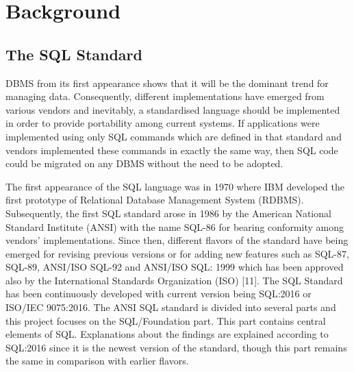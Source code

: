 \chapter{Background}

\section{The SQL Standard }
DBMS from its first appearance shows that it will be the dominant trend for managing data. Consequently, different implementations have emerged from various vendors and inevitably, a standardised language should be implemented in order to provide portability among current systems. If applications were implemented using only SQL commands which are defined in that standard and vendors implemented these commands in exactly the same way, then SQL code could be migrated on any DBMS without the need to be adopted.

The first appearance of the SQL language was in 1970 where IBM developed the first prototype of Relational Database Management System (RDBMS). Subsequently, the first SQL standard arose in 1986 by the American National Standard Institute (ANSI) with the name SQL-86 for bearing conformity among vendors’ implementations. Since then, different flavors of the standard have being emerged for revising previous versions or for adding new features such as SQL-87, SQL-89, ANSI/ISO SQL-92 and ANSI/ISO SQL: 1999 which has been approved also by the International Standards Organization (ISO) [11]. The SQL Standard has been continuously developed with current version being SQL:2016 or ISO/IEC 9075:2016. The ANSI SQL standard is divided into several parts and this project focuses on the SQL/Foundation part. This part contains central elements of SQL. Explanations about the findings are explained according to SQL:2016 since it is the newest version of the standard, though this part  remains the same in comparison with earlier flavors. 


